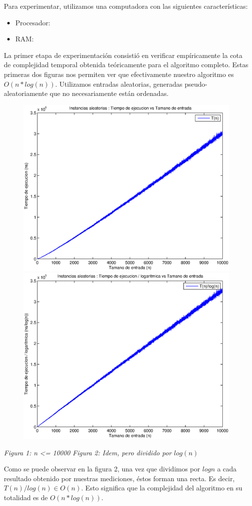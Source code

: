 Para experimentar, utilizamos una computadora con las siguientes características:

\begin{itemize}
 \item Procesador: 
 \item RAM: 
\end{itemize}

La primer etapa de experimentación consistió en verificar empíricamente la cota de complejidad temporal obtenida teóricamente para el algoritmo completo. Estas primeras dos figuras nos permiten ver que efectivamente nuestro algoritmo es $O(n * log(n))$. Utilizamos entradas aleatorias, generadas pseudo-aleatoriamente que no necesariamente están ordenadas.

\begin{figure}[H]
    \includegraphics[width=0.5\linewidth]{problema1/graficos/problema1_aleatoria_10000.eps}
    \includegraphics[width=0.5\linewidth]{problema1/graficos/problema1_aleatoria_10000_div_logn.eps}
\end{figure}
\emph{\hspace{2,5cm}Figura 1: n <= 10000 \hspace{3cm}Figura 2: Idem, pero dividido por $log(n)$}

Como se puede observar en la figura 2, una vez que dividimos por $log n$ a cada resultado obtenido por nuestras mediciones, éstos forman una recta. Es decir, $T(n)/log(n) \in O(n)$. Esto significa que la complejidad del algoritmo en su totalidad es de $O(n * log(n))$.

